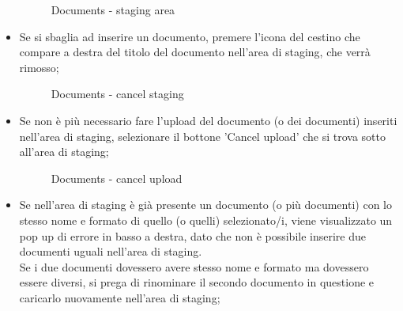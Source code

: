 \documentclass[10pt, a4paper]{article}
\begin{document}
\begin{itemize}
\begin{figure}[H]
        \caption{Documents - staging area}
        \label{img:docsStageArea}
    \end{figure}
    \item Se si sbaglia ad inserire un documento, premere l'icona del cestino che compare a destra del titolo del documento nell'area di staging, che verrà rimosso;
    \begin{figure}[H]
        \centering  
        \caption{Documents - cancel staging}
        \label{img:docsStageAreadel}
    \end{figure}
    \item Se non è più necessario fare l'upload del documento (o dei documenti) inseriti nell'area di staging, selezionare il bottone 'Cancel upload' che si trova sotto all'area di staging;
    \begin{figure}[H]
        \centering  
        \caption{Documents - cancel upload}
        \label{img:docsStageAreacancel}
    \end{figure}
    \item Se nell'area di staging è già presente un documento (o più documenti) con lo stesso nome e formato di quello (o quelli) selezionato/i, viene visualizzato un pop up di errore in basso a destra, dato che non è possibile inserire due documenti uguali nell'area di staging.\\ Se i due documenti dovessero avere stesso nome e formato ma dovessero essere diversi, si prega di rinominare il secondo documento in questione e caricarlo nuovamente nell'area di staging;

\end{itemize}
\end{document}
